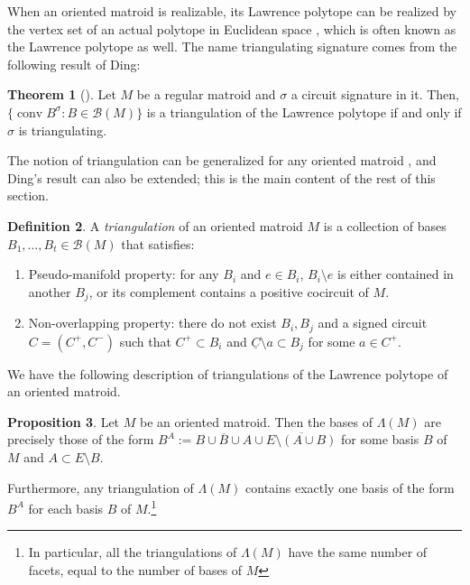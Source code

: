 \documentclass[12pt]{amsart}
\numberwithin{equation}{section}
\theoremstyle{definition}
\newtheorem{theorem}{Theorem}[section]
\newtheorem{definition}[theorem]{Definition}
\newtheorem{proposition}[theorem]{Proposition}
\newcommand{\Bcal}{{\mathcal B}}
\newcommand{\conv}{\operatorname{conv}}
\begin{document}
When an oriented matroid is realizable, its Lawrence polytope can be realized by the vertex set of an actual polytope in Euclidean space \cite[Proposition~9.3.2]{BLSWZ_book}, which is often known as the Lawrence polytope as well.
The name triangulating signature comes from the following result of Ding:

\begin{theorem}[]
Let $M$ be a regular matroid and $\sigma$ a circuit signature in it.
Then, $\{\conv{B^\sigma}:B\in\Bcal(M)\}$ is a triangulation of the Lawrence polytope if and only if $\sigma$ is triangulating.
\end{theorem}

The notion of triangulation can be generalized for any oriented matroid \cite{Santos_book}, and Ding's result can also be extended; this is the main content of the rest of this section.


\begin{definition}
A {\em triangulation} of an oriented matroid $M$ is a collection of bases $B_1,\ldots, B_t\in \Bcal(M) $ that satisfies:
\begin{enumerate}
    \item Pseudo-manifold property: for any $B_i$ and $e\in B_i$, $B_i\setminus e$ is either contained in another $B_j$, or its complement contains a positive cocircuit of $M$.
    \item Non-overlapping property: there do not exist $B_i,B_j$ and a signed circuit $C=(C^+,C^-)$ such that $C^+\subset B_i$ and $\underline{C}\setminus a\subset B_j$ for some $a\in C^+$.
\end{enumerate}
\end{definition}

We have the following description of triangulations of the Lawrence polytope of an oriented matroid.

\begin{proposition} \cite[Lemma~4.11 \& Proposition~4.12]{Santos_book}
\label{prop:triang-Lawrence}
Let $M$ be an oriented matroid.
Then the bases of $\Lambda(M)$ are precisely those of the form $B^A:=B\cup\overline{B}\cup A\cup \overline{E\setminus(A\cup B)}$ for some basis $B$ of $M$ and $A\subset E\setminus B$.

Furthermore, any triangulation of $\Lambda(M)$ contains exactly one basis of the form $B^A$ for each basis $B$ of $M$.\footnote{In particular, all the triangulations of $\Lambda(M)$ have the same number of facets, equal to the number of bases of $M$}
\end{proposition}
\end{document}
